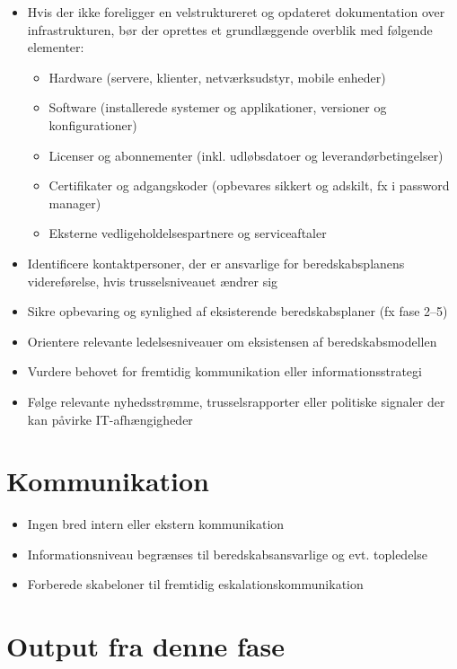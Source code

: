 \documentclass[a4paper,11pt]{book}
\begin{document}
\begin{itemize}
\item
  Hvis der ikke foreligger en velstruktureret og opdateret dokumentation
  over infrastrukturen, bør der oprettes et grundlæggende overblik med
  følgende elementer:

  \begin{itemize}
  \tightlist
  \item
    Hardware (servere, klienter, netværksudstyr, mobile enheder)
  \item
    Software (installerede systemer og applikationer, versioner og
    konfigurationer)
  \item
    Licenser og abonnementer (inkl. udløbsdatoer og
    leverandørbetingelser)
  \item
    Certifikater og adgangskoder (opbevares sikkert og adskilt, fx i
    password manager)
  \item
    Eksterne vedligeholdelsespartnere og serviceaftaler
  \end{itemize}
\item
  Identificere kontaktpersoner, der er ansvarlige for beredskabsplanens
  videreførelse, hvis trusselsniveauet ændrer sig
\item
  Sikre opbevaring og synlighed af eksisterende beredskabsplaner (fx
  fase 2--5)
\item
  Orientere relevante ledelsesniveauer om eksistensen af
  beredskabsmodellen
\item
  Vurdere behovet for fremtidig kommunikation eller informationsstrategi
\item
  Følge relevante nyhedsstrømme, trusselsrapporter eller politiske
  signaler der kan påvirke IT-afhængigheder
\end{itemize}

\section{Kommunikation}\label{kommunikation}

\begin{itemize}
\tightlist
\item
  Ingen bred intern eller ekstern kommunikation
\item
  Informationsniveau begrænses til beredskabsansvarlige og evt.
  topledelse
\item
  Forberede skabeloner til fremtidig eskalationskommunikation
\end{itemize}

\section{Output fra denne fase}\label{output-fra-denne-fase}
\end{document}
